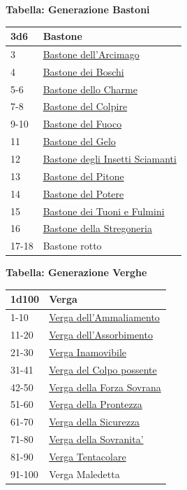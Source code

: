 \begin{multicols}{2}
{\medskip

\textbf{Tabella: Generazione Bastoni}\hypertarget{Bastoni}{}

\medskip

{\small\begin{tabularx}{0.45\textwidth}{lX}
		\toprule
\textbf{3d6} & \textbf{Bastone}\\
\toprule
3 & \hyperlink{Bastone dell'Arcimago}{Bastone dell'Arcimago}\\
4 & \hyperlink{Bastone dei Boschi}{Bastone dei Boschi}\\
5-6 & \hyperlink{Bastone dello Charme}{Bastone dello Charme}\\
7-8 & \hyperlink{Bastone del Colpire}{Bastone del Colpire}\\
9-10 & \hyperlink{Bastone del Fuoco}{Bastone del Fuoco}\\
11 & \hyperlink{Bastone del Gelo}{Bastone del Gelo}\\
12 & \hyperlink{Bastoned egli Insetti Sciamanti}{Bastone degli Insetti Sciamanti}\\
13 & \hyperlink{Bastone del Pitone}{Bastone del Pitone}\\
14 & \hyperlink{Bastone del Potere}{Bastone del Potere}\\
15 & \hyperlink{Bastone dei Tuoni e Fulmini}{Bastone dei Tuoni e Fulmini}\\
16 & \hyperlink{Bastone della Stregoneria}{Bastone della Stregoneria}\\
17-18 & Bastone rotto\\
\end{tabularx}}

\medskip

\textbf{Tabella: Generazione Verghe}\hypertarget{Verghe}{}

\medskip

{\small\begin{tabularx}{0.45\textwidth}{lX}
		\toprule
\textbf{1d100} & \textbf{Verga}\\
\toprule
1-10 & \hyperlink{Verga dell'Ammaliamento}{Verga dell'Ammaliamento}\\
11-20 & \hyperlink{Verga dell'Assorbimento}{Verga dell'Assorbimento}\\
21-30 & \hyperlink{Verga Inamovibile}{Verga Inamovibile}\\
31-41 & \hyperlink{Verga del Colpo possente}{Verga del Colpo possente}\\
42-50 & \hyperlink{Verga della Forza Sovrana}{Verga della Forza Sovrana}\\
51-60 & \hyperlink{Verga della Prontezza}{Verga della Prontezza}\\
61-70 & \hyperlink{Verga della Sicurezza}{Verga della Sicurezza}\\
71-80 & \hyperlink{Verga della Sovranita'}{Verga della Sovranita'}\\
81-90 & \hyperlink{Verga Tentacolare}{Verga Tentacolare}\\
91-100 & Verga Maledetta\\
\end{tabularx}}

}
\end{multicols}

